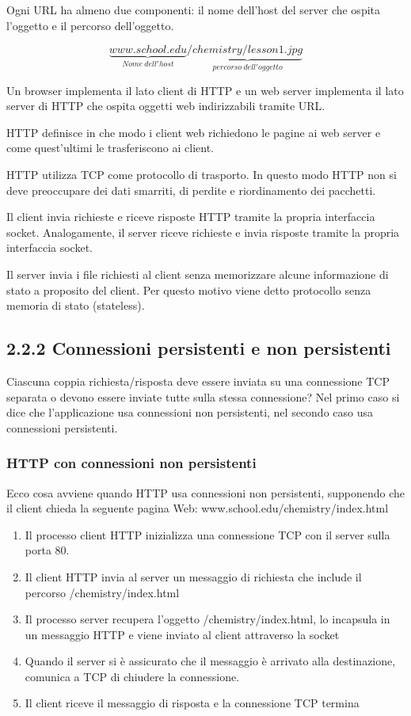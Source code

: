 \documentclass{book}
\begin{document}
Ogni URL ha almeno due componenti: il nome dell'host del server che ospita l'oggetto e il percorso dell'oggetto.

$$\underbrace{www.school.edu}_{Nome\ dell'host}/\underbrace{chemistry/lesson1.jpg}_{percorso\ dell'oggetto}$$

Un browser implementa il lato client di HTTP e un web server implementa il lato server di HTTP che ospita oggetti web indirizzabili tramite URL.

HTTP definisce in che modo i client web richiedono le pagine ai web server e come quest'ultimi le trasferiscono ai client.

HTTP utilizza TCP come protocollo di trasporto. In questo modo HTTP non si deve preoccupare dei dati smarriti, di perdite e riordinamento dei pacchetti.

Il client invia richieste e riceve risposte HTTP tramite la propria interfaccia socket. Analogamente, il server riceve richieste e invia risposte tramite la propria interfaccia socket.

Il server invia i file richiesti al client senza memorizzare alcune informazione di stato a proposito del client. Per questo motivo viene detto protocollo senza memoria di stato (stateless).

\subsection*{2.2.2 Connessioni persistenti e non persistenti}
Ciascuna coppia richiesta/risposta deve essere inviata su una connessione TCP separata o devono essere inviate tutte sulla stessa connessione? Nel primo caso si dice che l'applicazione usa connessioni non persistenti, nel secondo caso usa connessioni persistenti.

\subsubsection*{HTTP con connessioni non persistenti}
Ecco cosa avviene quando HTTP usa connessioni non persistenti, supponendo che il client chieda la seguente pagina Web: www.school.edu/chemistry/index.html
\begin{enumerate}
	\item Il processo client HTTP inizializza una connessione TCP con il server sulla porta 80.
	\item Il client HTTP invia al server un messaggio di richiesta che include il percorso /chemistry/index.html
	\item Il processo server recupera l'oggetto /chemistry/index.html, lo incapsula in un messaggio HTTP e viene inviato al client attraverso la socket
	\item Quando il server si è assicurato che il messaggio è arrivato alla destinazione, comunica a TCP di chiudere la connessione.
	\item Il client riceve il messaggio di risposta e la connessione TCP termina
\end{enumerate}
\end{document}

